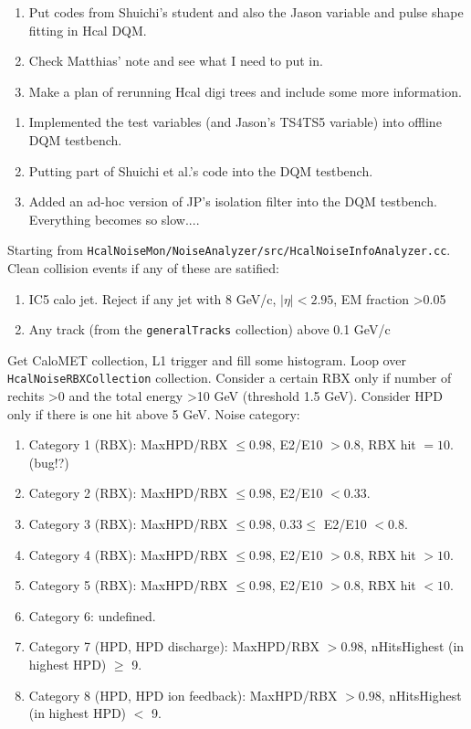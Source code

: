 

\begin{enumerate}
\item Put codes from Shuichi's student and also the Jason variable and pulse shape fitting in Hcal DQM.
\item Check Matthias' note and see what I need to put in.
\item Make a plan of rerunning Hcal digi trees and include some more information.
\end{enumerate}


\begin{enumerate}
\item Implemented the test variables (and Jason's TS4TS5 variable) into offline DQM testbench.
\item Putting part of Shuichi et al.'s code into the DQM testbench.
\item Added an ad-hoc version of JP's isolation filter into the DQM testbench.  Everything becomes so slow....
\end{enumerate}


Starting from \texttt{HcalNoiseMon/NoiseAnalyzer/src/HcalNoiseInfoAnalyzer.cc}.
Clean collision events if any of these are satified:

\begin{enumerate}
\item IC5 calo jet.  Reject if any jet with 8 GeV/c, $|\eta| < 2.95$, EM fraction \textgreater 0.05
\item Any track (from the \texttt{generalTracks} collection) above 0.1 GeV/c
\end{enumerate}

Get CaloMET collection, L1 trigger and fill some histogram. Loop over \texttt{HcalNoiseRBXCollection} collection.
Consider a certain RBX only if number of rechits \textgreater 0 and the total energy \textgreater 10 GeV
(threshold 1.5 GeV).  Consider HPD only if there is one hit above 5 GeV.
Noise category:

\begin{enumerate}
\item Category 1 (RBX): MaxHPD/RBX $\le 0.98$, E2/E10 $> 0.8$, RBX hit $= 10$.  (bug!?)
\item Category 2 (RBX): MaxHPD/RBX $\le 0.98$, E2/E10 $< 0.33$.
\item Category 3 (RBX): MaxHPD/RBX $\le 0.98$, $0.33 \le $ E2/E10 $< 0.8$.
\item Category 4 (RBX): MaxHPD/RBX $\le 0.98$, E2/E10 $> 0.8$, RBX hit $> 10$.
\item Category 5 (RBX): MaxHPD/RBX $\le 0.98$, E2/E10 $> 0.8$, RBX hit $< 10$.
\item Category 6: undefined.
\item Category 7 (HPD, HPD discharge): MaxHPD/RBX $> 0.98$, nHitsHighest (in highest HPD) $\ge$ 9.
\item Category 8 (HPD, HPD ion feedback): MaxHPD/RBX $> 0.98$, nHitsHighest (in highest HPD) $<$ 9.
\end{enumerate}

